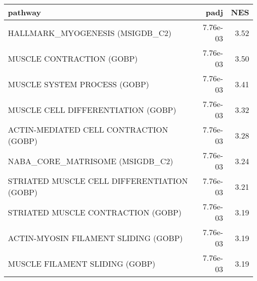 \begin{tabular}{lrr}
\toprule
                                     pathway &      padj &   NES \\
\midrule
             HALLMARK\_MYOGENESIS (MSIGDB\_C2) &  7.76e-03 &  3.52 \\
                   MUSCLE CONTRACTION (GOBP) &  7.76e-03 &  3.50 \\
                MUSCLE SYSTEM PROCESS (GOBP) &  7.76e-03 &  3.41 \\
          MUSCLE CELL DIFFERENTIATION (GOBP) &  7.76e-03 &  3.32 \\
      ACTIN-MEDIATED CELL CONTRACTION (GOBP) &  7.76e-03 &  3.28 \\
             NABA\_CORE\_MATRISOME (MSIGDB\_C2) &  7.76e-03 &  3.24 \\
 STRIATED MUSCLE CELL DIFFERENTIATION (GOBP) &  7.76e-03 &  3.21 \\
          STRIATED MUSCLE CONTRACTION (GOBP) &  7.76e-03 &  3.19 \\
        ACTIN-MYOSIN FILAMENT SLIDING (GOBP) &  7.76e-03 &  3.19 \\
              MUSCLE FILAMENT SLIDING (GOBP) &  7.76e-03 &  3.19 \\
\bottomrule
\end{tabular}
